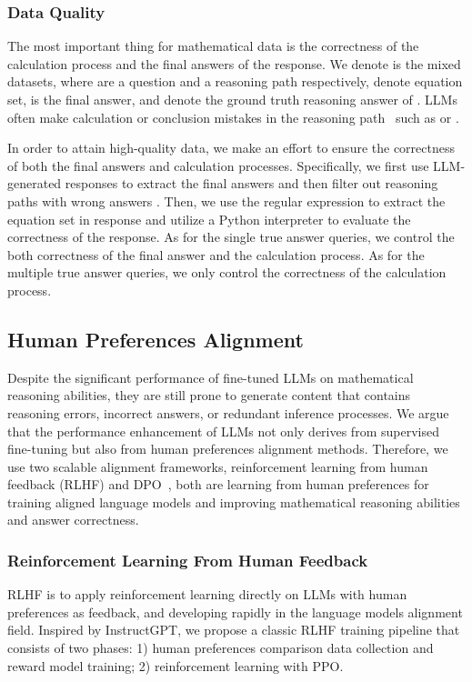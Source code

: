 \documentclass{article}
\begin{document}
\subsubsection{Data Quality}
The most important thing for mathematical data is the correctness of the calculation process and the final answers of the response.
We denote  is the mixed datasets, where  are a question and a reasoning path respectively,  denote equation set,  is the final answer, and  denote the ground truth reasoning answer of . LLMs often make calculation or conclusion mistakes in the reasoning path~\cite{gao2023pal,chen2022program} such as  or . 

In order to attain high-quality data, we make an effort to ensure the correctness of both the final answers and calculation processes. Specifically, we first use LLM-generated responses to extract the final answers  and then filter out reasoning paths  with wrong answers . Then, we use the regular expression to extract the equation set  in response and utilize a Python interpreter to evaluate the correctness of the response. As for the single true answer queries, we control the both correctness of the final answer and the calculation process. As for the multiple true answer queries, we only control the correctness of the calculation process. 





\subsection{Human Preferences Alignment}
Despite the significant performance of fine-tuned LLMs on mathematical reasoning abilities, they are still prone to generate content that contains reasoning errors, incorrect answers, or redundant inference processes. We argue that the performance enhancement of LLMs not only derives from supervised fine-tuning but also from human preferences alignment methods. Therefore, we use two scalable alignment frameworks, reinforcement learning from human feedback (RLHF) and DPO~\cite{rafailov2023direct}, both are learning from human preferences for training aligned language models and improving mathematical reasoning abilities and answer correctness.

\subsubsection{Reinforcement Learning From Human Feedback}
RLHF is to apply reinforcement learning directly on LLMs with human preferences as feedback, and developing rapidly in the language models alignment field. Inspired by InstructGPT, we propose a classic RLHF training pipeline that consists of two phases: 1) human preferences comparison data collection and reward model training; 2) reinforcement learning with PPO.
\end{document}

